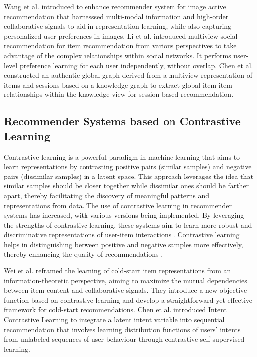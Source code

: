     Wang et al.\cite{wang2024mmkdgat} introduced to enhance recommender system for  image active recommendation that harnesssed multi-modal information and high-order collaborative signals to aid in representation learning, while also capturing personalized user preferences in images.  Li et al.  \cite{li2024multi} introduced  multiview social recommendation for item recommendation from various perspectives  to take advantage of the complex relationships within social networks. It performs user-level preference learning for each user independently, without overlap. Chen et al. \cite{chen2023knowledge} constructed an authentic global graph derived from a multiview representation of items and sessions based on a knowledge graph to extract global item-item relationships within the knowledge view for session-based recommendation.
    
\subsection{Recommender Systems based on Contrastive Learning}

    Contrastive learning \cite{chen2020simple} is a powerful paradigm in machine learning that aims to learn representations by contrasting positive pairs (similar samples) and negative pairs (dissimilar samples) in a latent space. This approach leverages the idea that similar samples should be closer together while dissimilar ones should be farther apart, thereby facilitating the discovery of meaningful patterns and representations from data. The use of contrastive learning in recommender systems has increased, with various versions being implemented. By leveraging the strengths of contrastive learning, these systems aim to learn more robust and discriminative representations of user-item interactions \cite{shuai2022review}.  Contrastive learning helps in distinguishing between positive and negative samples more effectively, thereby enhancing the quality of recommendations \cite{liu2021contrastive}.
    
    Wei et al. \cite{wei2021contrastive}  reframed the learning of cold-start item representations from an information-theoretic perspective, aiming to maximize the mutual dependencies between item content and collaborative signals. They introduce a new objective function based on contrastive learning and develop a straightforward yet effective framework for cold-start recommendations. Chen et al. \cite{chen2022intent} introduced Intent Contrastive Learning to  integrate a latent intent variable into sequential recommendation that involves learning distribution functions of users' intents from unlabeled sequences of user behaviour through contrastive self-supervised learning.
    
